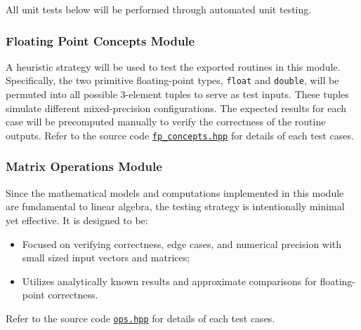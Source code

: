 \documentclass[12pt, titlepage]{article}
\begin{document}
All unit tests below will be performed through automated unit testing.


\subsubsection{Floating Point Concepts Module}

A heuristic strategy will be used to test the exported routines in this module.
Specifically, the two primitive floating-point types, \texttt{float} and
\texttt{double}, will be permuted into all possible 3-element tuples to serve as
test inputs. These tuples simulate different mixed-precision configurations. The
expected results for each case will be precomputed manually to verify the
correctness of the routine outputs. Refer to the source code
\href{https://github.com/yex33/MPIR/blob/main/include/fp_concepts.hpp}{\texttt{fp\_concepts.hpp}}
for details of each test cases.

\subsubsection{Matrix Operations Module}

Since the mathematical models and computations implemented in this module are
fundamental to linear algebra, the testing strategy is intentionally minimal yet
effective. It is designed to be:
\begin{itemize}
\item Focused on verifying correctness, edge cases, and numerical
  precision with small sized input vectors and matrices;
\item Utilizes analytically known results and approximate comparisons for
  floating-point correctness.
\end{itemize}
Refer to the source code
\href{https://github.com/yex33/MPIR/blob/main/include/ops.hpp}{\texttt{ops.hpp}}
for details of each test cases.



\end{document}

